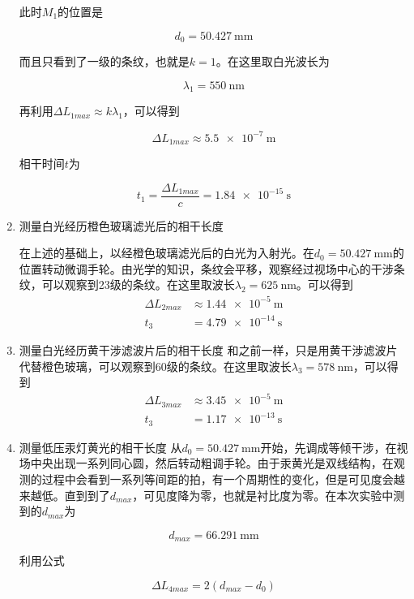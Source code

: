 \documentclass[a4paper]{article}
\begin{document}
\begin{changemargin}{1cm}{1cm}
\begin{spacing}{1.6}
\begin{enumerate}
              此时$M_1$的位置是

              $$d_0=\SI{50.427}{\mm}$$

              而且只看到了一级的条纹，也就是$k=1$。在这里取白光波长为

              $$\lambda_1=\SI{550}{\nm}$$

              再利用$\Delta L_{1max}\approx k \lambda_1$，可以得到

              $$\Delta L_{1max} \approx \SI{5.5e-7}{\m}$$

              相干时间$t$为

              $$t_1=\frac{\Delta L_{1max}}{c}=\SI{1.84e-15}{\s}$$

        \item 测量白光经历橙色玻璃滤光后的相干长度

              在上述的基础上，以经橙色玻璃滤光后的白光为入射光。在$d_0=\SI{50.427}{\mm}$的位置转动微调手轮。由光学的知识，条纹会平移，观察经过视场中心的干涉条纹，可以观察到23级的条纹。在这里取波长$\lambda_2=\SI{625}{\nm}$。可以得到
              $$\begin{aligned}
                      \Delta L_{2max} & \approx \SI{1.44e-5}{\m} \\
                      t_3             & =\SI{4.79e-14}{\s}
                  \end{aligned}$$

        \item 测量白光经历黄干涉滤波片后的相干长度
              和之前一样，只是用黄干涉滤波片代替橙色玻璃，可以观察到60级的条纹。在这里取波长$\lambda_3=\SI{578}{\nm}$，可以得到
              $$\begin{aligned}
                      \Delta L_{3max} & \approx \SI{3.45e-5}{\m} \\
                      t_3             & =\SI{1.17e-13}{\s}
                  \end{aligned}$$

        \item 测量低压汞灯黄光的相干长度
              从$d_0=\SI{50.427}{\mm}$开始，先调成等倾干涉，在视场中央出现一系列同心圆，然后转动粗调手轮。由于汞黄光是双线结构，在观测的过程中会看到一系列等间距的拍，有一个周期性的变化，但是可见度会越来越低。直到到了$d_{max}$，可见度降为零，也就是衬比度为零。在本次实验中测到的$d_{max}$为

              $$ d_{max}=\SI{66.291}{\mm}$$

              利用公式

              $$\Delta L_{4max}=2(d_{max}-d_0)$$


\end{enumerate}
\end{spacing}
\end{changemargin}
\end{document}
